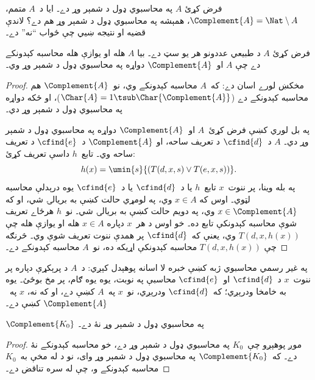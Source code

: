 \documentclass[../../../include/open-logic-section]{subfiles}
\begin{document}

فرض کړئ $A$ په محاسبوي ډول د شمېر وړ دے۔ ايا د~$A$ متمم،
$\Complement{A} = \Nat \setminus A$، همېشه په محاسبوي ډول د شمېر وړ
هم دے؟ لاندې قضيه او نتيجه ښيي چې ځواب ``نه'' دے۔

\begin{thm}
فرض کړئ $A$ د طبيعي عددونو هر يو سټ دے۔ بيا $A$ هله او يوازې هله
محاسبه کېدونکے دے چې $A$ او~$\Complement{A}$ دواړه په محاسبوي ډول
د شمېر وړ وي۔
\end{thm}

\begin{proof}
مخکښ لورے اسان دے: که~$A$ محاسبه کېدونکے وي، نو~$\Complement{A}$
هم محاسبه کېدونکے دے ($\Char{A} = 1 \tsub
\Char{\Complement{A}}$)، او ځکه دواړه په محاسبوي ډول د شمېر وړ دي۔

په بل لوري کښې فرض کړئ~$A$ او~$\Complement{A}$ دواړه په محاسبوي ډول
د شمېر وړ دي۔ $A$ د~$\cfind{d}$ د تعريف ساحه، او
$\Complement{A}$ د~$\cfind{e}$ د تعريف ساحه وي۔ تابع~$h$ داسې تعريف
کړئ:
\[
h(x) = \umin{s}{(T(d,x,s) \lor T(e,x,s))}.
\]
په بله وينا، پر ننوت~$x$ تابع~$h$ يا د~$\cfind{d}$ يا
د~$\cfind{e}$ يوه درېدلې محاسبه لټوي۔ اوس که $x \in A$ وي، په
لومړي حالت کښې به بريالۍ شي، او که $x \in \Complement{A}$ وي، په
دويم حالت کښې به بريالۍ شي۔ نو~$h$ هرځاے تعريف شوې محاسبه کېدونکې
تابع ده۔ خو اوس د هر~$x$ دپاره $x \in A$ هله او يوازې هله چې
$T(d, x, h(x))$ وي، يعنې که~$\cfind{d}$ پر همدې ننوت تعريف شوې وي۔
څرنګه چې $T(d, x, h(x))$ محاسبه کېدونکې اړيکه ده، نو~$A$
محاسبه کېدونکے دے۔
\end{proof}

\begin{explain}
په غير رسمي محاسبوي ژبه کښې خبره لا اسانه پوهېدل کېږي: د~$A$ د
پرېکړې دپاره پر ننوت~$x$ د~$\cfind{d}$ او~$\cfind{e}$ محاسبې په
نوبت، يوه يوه ګام، پر مخ بوځئ۔ يوه به خامخا ودرېږي؛ که~$\cfind{d}$ ودرېږي، نو~$x$
په~$A$ کښې دے، او که نه، $x$ په~$\Complement{A}$ کښې دے۔
\end{explain}

\begin{cor}
$\Complement{K_0}$ په محاسبوي ډول د شمېر وړ نۀ دے۔
\end{cor}

\begin{proof}
موږ پوهېږو چې~$K_0$ په محاسبوي ډول د شمېر وړ دے، خو محاسبه کېدونکے
نۀ دے۔ که~$\Complement{K_0}$ په محاسبوي ډول د شمېر وړ وای، نو د
 له مخې به~$K_0$ محاسبه کېدونکے و، چې له
 سره تناقض دے۔
\end{proof}
\end{document}
